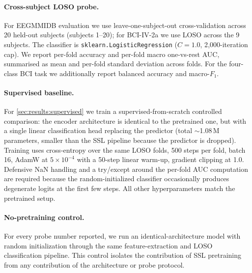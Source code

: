 \paragraph{Cross-subject LOSO probe.}
For EEGMMIDB evaluation we use leave-one-subject-out cross-validation
across 20 held-out subjects (subjects 1--20); for BCI-IV-2a we use LOSO
across the 9 subjects. The classifier is
\texttt{sklearn.LogisticRegression} ($C{=}1.0$, 2{,}000-iteration cap). We
report per-fold accuracy and per-fold macro one-vs-rest AUC, summarised as
mean and per-fold standard deviation across folds. For the four-class BCI
task we additionally report balanced accuracy and macro-$F_1$.

\paragraph{Supervised baseline.}
For \cref{sec:results:supervised} we train a supervised-from-scratch
controlled comparison: the encoder architecture is identical to the
pretrained one, but with a single linear classification head replacing
the predictor (total $\sim$1.08\,M parameters, smaller than the SSL
pipeline because the predictor is dropped). Training uses cross-entropy
over the same LOSO folds, 500 steps per fold, batch 16, AdamW at
$5{\times}10^{-4}$ with a 50-step linear warm-up, gradient clipping at
1.0. Defensive NaN handling and a try/except around the per-fold AUC
computation are required because the random-initialized classifier
occasionally produces degenerate logits at the first few steps. All other
hyperparameters match the pretrained setup.

\paragraph{No-pretraining control.}
For every probe number reported, we run an identical-architecture model
with random initialization through the same feature-extraction and LOSO
classification pipeline. This control isolates the contribution of SSL
pretraining from any contribution of the architecture or probe protocol.
